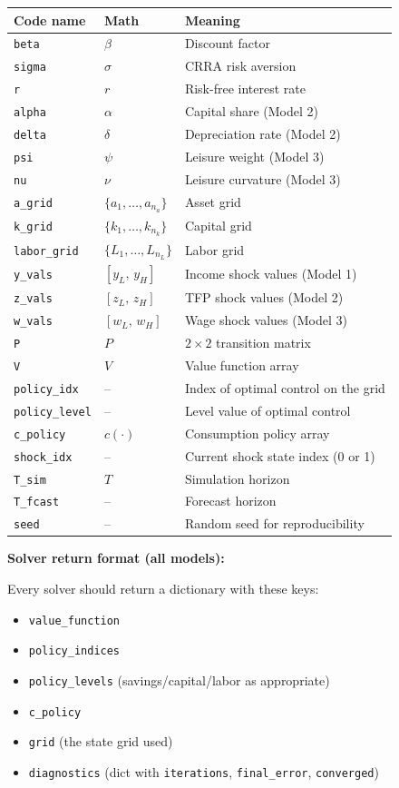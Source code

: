 \documentclass[11pt]{article}
\begin{document}
\begin{tabularx}{\linewidth}{@{}llX@{}}
\toprule
\textbf{Code name} & \textbf{Math} & \textbf{Meaning} \\
\midrule
\texttt{beta} & $\beta$ & Discount factor \\
\texttt{sigma} & $\sigma$ & CRRA risk aversion \\
\texttt{r} & $r$ & Risk-free interest rate \\
\texttt{alpha} & $\alpha$ & Capital share (Model 2) \\
\texttt{delta} & $\delta$ & Depreciation rate (Model 2) \\
\texttt{psi} & $\psi$ & Leisure weight (Model 3) \\
\texttt{nu} & $\nu$ & Leisure curvature (Model 3) \\
\midrule
\texttt{a\_grid} & $\{a_1,\ldots,a_{n_a}\}$ & Asset grid \\
\texttt{k\_grid} & $\{k_1,\ldots,k_{n_k}\}$ & Capital grid \\
\texttt{labor\_grid} & $\{L_1,\ldots,L_{n_L}\}$ & Labor grid \\
\midrule
\texttt{y\_vals} & $[y_L,\,y_H]$ & Income shock values (Model 1) \\
\texttt{z\_vals} & $[z_L,\,z_H]$ & TFP shock values (Model 2) \\
\texttt{w\_vals} & $[w_L,\,w_H]$ & Wage shock values (Model 3) \\
\texttt{P} & $P$ & $2\times2$ transition matrix \\
\midrule
\texttt{V} & $V$ & Value function array \\
\texttt{policy\_idx} & -- & Index of optimal control on the grid \\
\texttt{policy\_level} & -- & Level value of optimal control \\
\texttt{c\_policy} & $c(\cdot)$ & Consumption policy array \\
\midrule
\texttt{shock\_idx} & -- & Current shock state index (0 or 1) \\
\texttt{T\_sim} & $T$ & Simulation horizon \\
\texttt{T\_fcast} & -- & Forecast horizon \\
\texttt{seed} & -- & Random seed for reproducibility \\
\bottomrule
\end{tabularx}

\bigskip

\textbf{Solver return format (all models):}

Every solver should return a dictionary with these keys:
\begin{itemize}
    \item \texttt{value\_function}
    \item \texttt{policy\_indices}
    \item \texttt{policy\_levels} (savings/capital/labor as appropriate)
    \item \texttt{c\_policy}
    \item \texttt{grid} (the state grid used)
    \item \texttt{diagnostics} (dict with \texttt{iterations}, \texttt{final\_error}, \texttt{converged})
\end{itemize}
\end{document}
